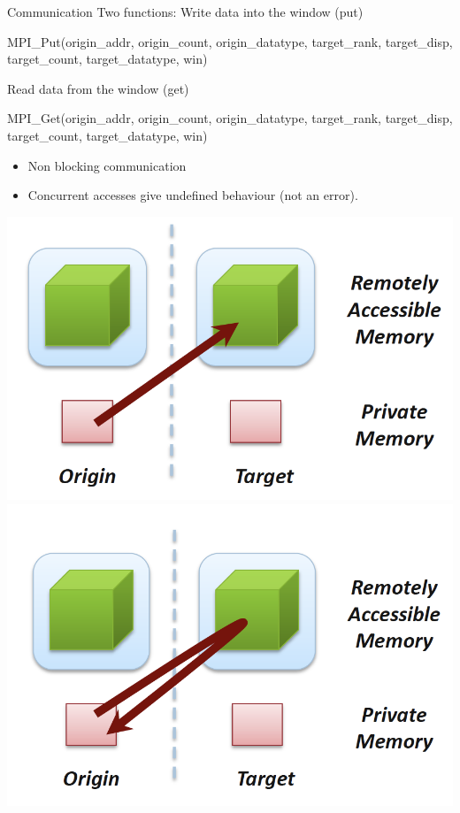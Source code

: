 \documentclass[aspectratio=43]{beamer}
\begin{document}
\begin{frame}[fragile]{Communication}
Two functions:
Write data into the window (put)
\begin{Pseudolisting}[]{}
MPI_Put(origin_addr, origin_count, origin_datatype, 
        target_rank, target_disp, target_count, target_datatype, win)
\end{Pseudolisting}

Read data from the window (get)
\begin{Pseudolisting}[]{}
MPI_Get(origin_addr, origin_count, origin_datatype, 
        target_rank, target_disp, target_count, 
        target_datatype, win)
\end{Pseudolisting}

\begin{itemize}
\item Non blocking communication
\item Concurrent accesses give undefined behaviour (not an error).
\end{itemize}
\begin{center}
    \includegraphics[scale=0.25]{07.MPI_RMA/put.png}\hspace{0.5in}
    \includegraphics[scale=0.25]{07.MPI_RMA/get.png}
\end{center}
\end{frame}
\end{document}
